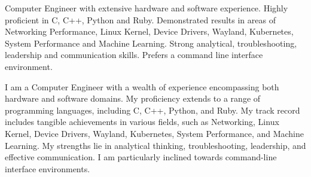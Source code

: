 

\begin{cvparagraph}

Computer Engineer with extensive hardware and software experience.  
  Highly proficient in C, C++, Python and Ruby. 
  Demonstrated results in areas of Networking Performance, Linux Kernel, Device
  Drivers, Wayland, Kubernetes, System Performance and Machine Learning.
  Strong analytical, troubleshooting, leadership and communication skills. 
  Prefers a command line interface environment.

I am a Computer Engineer with a wealth of experience encompassing both hardware and software domains. 
  My proficiency extends to a range of programming languages, including C, C++, Python, and Ruby. 
  My track record includes tangible achievements in various fields, such as Networking, Linux Kernel, Device Drivers, Wayland, Kubernetes, System Performance, and Machine Learning.
  My strengths lie in analytical thinking, troubleshooting, leadership, and effective communication. I am particularly inclined towards command-line interface environments.
\end{cvparagraph}

